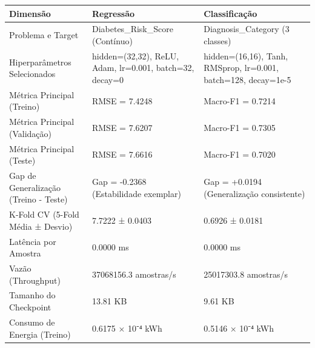 \begin{tabular}{lll}
\toprule
Dimensão & Regressão & Classificação \\
\midrule
Problema e Target & Diabetes_Risk_Score (Contínuo) & Diagnosis_Category (3 classes) \\
Hiperparâmetros Selecionados & hidden=(32,32), ReLU, Adam, lr=0.001, batch=32, decay=0 & hidden=(16,16), Tanh, RMSprop, lr=0.001, batch=128, decay=1e-5 \\
Métrica Principal (Treino) & RMSE = 7.4248 & Macro-F1 = 0.7214 \\
Métrica Principal (Validação) & RMSE = 7.6207 & Macro-F1 = 0.7305 \\
Métrica Principal (Teste) & RMSE = 7.6616 & Macro-F1 = 0.7020 \\
Gap de Generalização (Treino - Teste) & Gap = -0.2368 (Estabilidade exemplar) & Gap = +0.0194 (Generalização consistente) \\
K-Fold CV (5-Fold Média ± Desvio) & 7.7222 ± 0.0403 & 0.6926 ± 0.0181 \\
Latência por Amostra & 0.0000 ms & 0.0000 ms \\
Vazão (Throughput) & 37068156.3 amostras/s & 25017303.8 amostras/s \\
Tamanho do Checkpoint & 13.81 KB & 9.61 KB \\
Consumo de Energia (Treino) & 0.6175 × 10⁻⁴ kWh & 0.5146 × 10⁻⁴ kWh \\
\bottomrule
\end{tabular}
